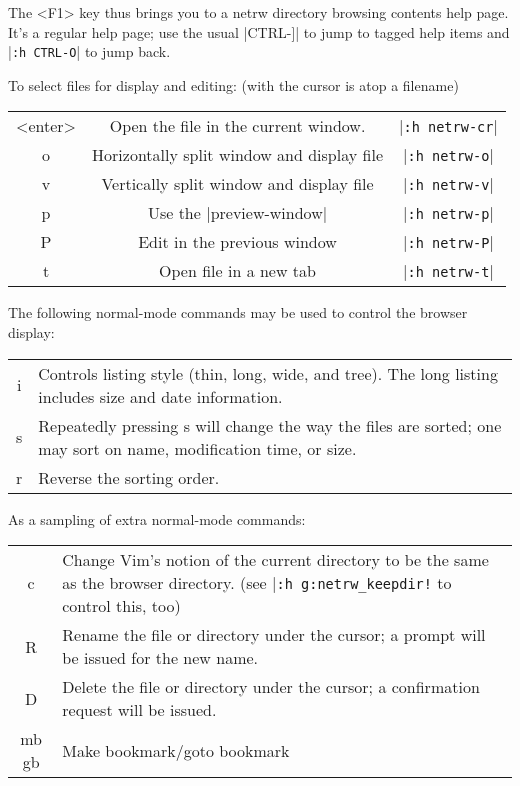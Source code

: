 The <F1> key thus brings you to a netrw directory browsing contents help page.
It's a regular help page; use the usual |CTRL-]| to jump to tagged help items and |\verb!:h CTRL-O!| to jump back.

To select files for display and editing: (with the cursor is atop a filename)

\begin{center} \begin{longtable}{c c c}
				<enter> & Open the file in the current window. & |\verb!:h netrw-cr!| \\
				o & Horizontally split window and display file & |\verb!:h netrw-o!| \\
				v & Vertically split window and display file & |\verb!:h netrw-v!| \\
				p & Use the |preview-window| & |\verb!:h netrw-p!| \\
				P & Edit in the previous window & |\verb!:h netrw-P!| \\
				t & Open file in a new tab & |\verb!:h netrw-t!|
\end{longtable} \end{center}

The following normal-mode commands may be used to control the browser display:

\begin{center} \begin{longtable}{c l}
				i & Controls listing style (thin, long, wide, and tree).  The long listing includes size and date information. \\
				s & Repeatedly pressing s will change the way the files are sorted; one may sort on name, modification time, or size. \\
				r & Reverse the sorting order. \\
\end{longtable} \end{center}

As a sampling of extra normal-mode commands:

\begin{center} \begin{tabularx}{\textwidth}{c X}
				c & Change Vim's notion of the current directory to be the same as the browser directory.  (see |\texttt{:h g:netrw\_keepdir!} to control this, too) \\
				R & Rename the file or directory under the cursor; a prompt will be issued for the new name.\\
				D & Delete the file or directory under the cursor; a confirmation request will be issued.\\
				mb gb & Make bookmark/goto bookmark\\
\end{tabularx} \end{center}

